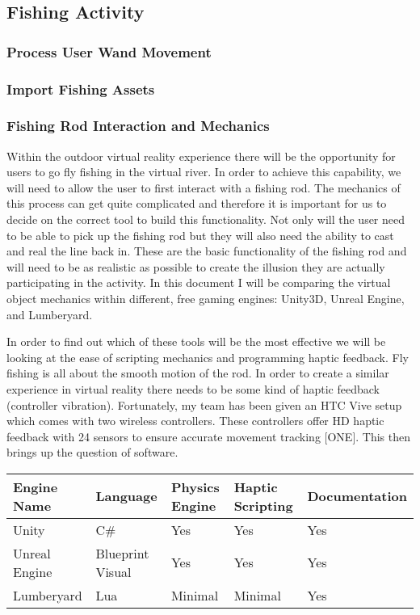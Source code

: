 \documentclass[10pt,journal,compsoc,onecolumn, draftclsnofoot]{IEEEtran}
\begin{document}
\subsection{Fishing Activity}
\subsubsection{Process User Wand Movement}

\subsubsection{Import Fishing Assets}

\subsubsection{Fishing Rod Interaction and Mechanics}
Within the outdoor virtual reality experience there will be the opportunity for users to go fly fishing in the virtual river. In order to achieve this capability, we will need to allow the user to first interact with a fishing rod. The mechanics of this process can get quite complicated and therefore it is important for us to decide on the correct tool to build this functionality. Not only will the user need to be able to pick up the fishing rod but they will also need the ability to cast and real the line back in. These are the basic functionality of the fishing rod and will need to be as realistic as possible to create the illusion they are actually participating in the activity. In this document I will be comparing the virtual object mechanics within different, free gaming engines: Unity3D, Unreal Engine, and Lumberyard.

In order to find out which of these tools will be the most effective we will be looking at the ease of scripting mechanics and programming haptic feedback. Fly fishing is all about the smooth motion of the rod. In order to create a similar experience in virtual reality there needs to be some kind of haptic feedback (controller vibration). Fortunately, my team has been given an HTC Vive setup which comes with two wireless controllers. These controllers offer HD haptic feedback with 24 sensors to ensure accurate movement tracking [ONE]. This then brings up the question of software.

\vspace{2mm}
\begin{table}[h!]
\centering
  \begin{tabu} to 1.0\textwidth { | X[l] || X[c] | X[c] | X[c] | X[c] |  }
  \hline
  Engine Name & Language & Physics Engine & Haptic Scripting & Documentation\\
  \hline
  Unity  & C\# & Yes & Yes & Yes\\
  Unreal Engine &   Blueprint Visual  & Yes & Yes & Yes\\
  Lumberyard & Lua & Minimal & Minimal & Yes \\
  \hline
  \end{tabu}
\end{table}
\vspace{2mm}
\end{document}
